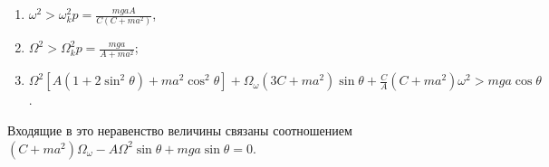 \begin{enumerate}
\item $\omega ^2 > \omega ^2_kp = \frac{mgaA}{C(C + ma^2)}$,
\item $\Omega ^2 > \Omega ^2_kp = \frac{mga}{A + ma^2}$;
\item $\Omega ^2[A(1 + 2\sin^2{\theta}) + ma^2\cos^2{\theta}]+
\Omega _{\omega}(3C + ma^2)\sin{\theta} +
\frac{C}{A}(C + ma^2)\omega ^2 > mga\cos{\theta}$.
\end{enumerate}
Входящие в это неравенство величины связаны соотношением
$(C + ma^2)\Omega _{\omega} - A\Omega ^2\sin{\theta}+
mga\sin{\theta} = 0$.
